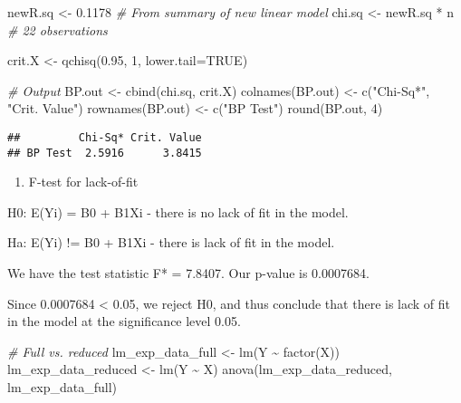 \documentclass[
]{article}
\newenvironment{Shaded}{\begin{snugshade}}{\end{snugshade}}
\newcommand{\AttributeTok}[1]{\textcolor[rgb]{0.77,0.63,0.00}{#1}}
\newcommand{\CommentTok}[1]{\textcolor[rgb]{0.56,0.35,0.01}{\textit{#1}}}
\newcommand{\ConstantTok}[1]{\textcolor[rgb]{0.00,0.00,0.00}{#1}}
\newcommand{\DecValTok}[1]{\textcolor[rgb]{0.00,0.00,0.81}{#1}}
\newcommand{\FloatTok}[1]{\textcolor[rgb]{0.00,0.00,0.81}{#1}}
\newcommand{\FunctionTok}[1]{\textcolor[rgb]{0.00,0.00,0.00}{#1}}
\newcommand{\NormalTok}[1]{#1}
\newcommand{\OtherTok}[1]{\textcolor[rgb]{0.56,0.35,0.01}{#1}}
\newcommand{\SpecialCharTok}[1]{\textcolor[rgb]{0.00,0.00,0.00}{#1}}
\newcommand{\StringTok}[1]{\textcolor[rgb]{0.31,0.60,0.02}{#1}}
\providecommand{\tightlist}{%
  \setlength{\itemsep}{0pt}\setlength{\parskip}{0pt}}
\begin{document}
\begin{Shaded}
\begin{Highlighting}[]
\NormalTok{newR.sq }\OtherTok{\textless{}{-}} \FloatTok{0.1178} \CommentTok{\# From summary of new linear model}
\NormalTok{chi.sq }\OtherTok{\textless{}{-}}\NormalTok{ newR.sq }\SpecialCharTok{*}\NormalTok{ n }\CommentTok{\# 22 observations}

\NormalTok{crit.X }\OtherTok{\textless{}{-}} \FunctionTok{qchisq}\NormalTok{(}\FloatTok{0.95}\NormalTok{, }\DecValTok{1}\NormalTok{, }\AttributeTok{lower.tail=}\ConstantTok{TRUE}\NormalTok{)}

\CommentTok{\# Output}
\NormalTok{BP.out }\OtherTok{\textless{}{-}} \FunctionTok{cbind}\NormalTok{(chi.sq, crit.X)}
\FunctionTok{colnames}\NormalTok{(BP.out) }\OtherTok{\textless{}{-}} \FunctionTok{c}\NormalTok{(}\StringTok{"Chi{-}Sq*"}\NormalTok{, }\StringTok{"Crit. Value"}\NormalTok{)}
\FunctionTok{rownames}\NormalTok{(BP.out) }\OtherTok{\textless{}{-}} \FunctionTok{c}\NormalTok{(}\StringTok{"BP Test"}\NormalTok{)}
\FunctionTok{round}\NormalTok{(BP.out, }\DecValTok{4}\NormalTok{)}
\end{Highlighting}
\end{Shaded}

\begin{verbatim}
##         Chi-Sq* Crit. Value
## BP Test  2.5916      3.8415
\end{verbatim}

\begin{enumerate}
\def\labelenumi{\roman{enumi})}
\tightlist
\item
  F-test for lack-of-fit
\end{enumerate}

H0: E(Yi) = B0 + B1Xi - there is no lack of fit in the model.

Ha: E(Yi) != B0 + B1Xi - there is lack of fit in the model.

We have the test statistic F* = 7.8407. Our p-value is 0.0007684.

Since 0.0007684 \textless{} 0.05, we reject H0, and thus conclude that
there is lack of fit in the model at the significance level 0.05.

\begin{Shaded}
\begin{Highlighting}[]
\CommentTok{\# Full vs. reduced}
\NormalTok{lm\_exp\_data\_full }\OtherTok{\textless{}{-}} \FunctionTok{lm}\NormalTok{(Y }\SpecialCharTok{\textasciitilde{}} \FunctionTok{factor}\NormalTok{(X))}
\NormalTok{lm\_exp\_data\_reduced }\OtherTok{\textless{}{-}} \FunctionTok{lm}\NormalTok{(Y }\SpecialCharTok{\textasciitilde{}}\NormalTok{ X)}
\FunctionTok{anova}\NormalTok{(lm\_exp\_data\_reduced, lm\_exp\_data\_full)}
\end{Highlighting}
\end{Shaded}
\end{document}
